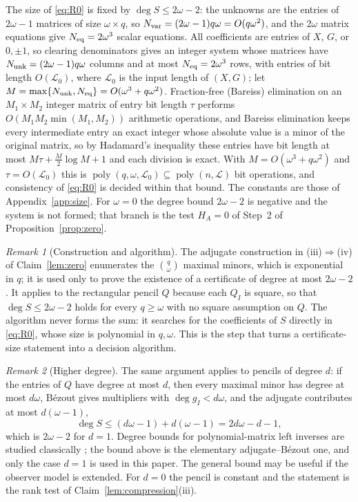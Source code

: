 \documentclass[journal]{IEEEtran}
\theoremstyle{plainn}
\theoremstyle{remark}
\newtheorem{remark}{Remark}
\begin{document}
The size of \eqref{eq:R0} is fixed by $\deg S\le2\omega-2$: the unknowns are the entries of
$2\omega-1$ matrices of size $\omega\times q$, so $N_{\rm var}=(2\omega-1)q\omega=O(q\omega^2)$,
and the $2\omega$ matrix equations give $N_{\rm eq}=2\omega^3$ scalar equations. All coefficients are entries of $X$, $G$, or
$0,\pm1$, so clearing denominators gives an integer system whose matrices have
$N_{\rm unk}=(2\omega-1)q\omega$ columns and at most $N_{\rm eq}=2\omega^3$ rows, with entries of bit
length $O(\mathcal L_0)$, where $\mathcal L_0$ is the input length of $(X,G)$; let
$M=\max\{N_{\rm unk},N_{\rm eq}\}=O(\omega^3+q\omega^2)$. Fraction-free (Bareiss) elimination on an
$M_1\times M_2$ integer matrix of entry bit length $\tau$ performs $O(M_1M_2\min(M_1,M_2))$ arithmetic
operations, and Bareiss elimination keeps every intermediate entry an exact integer whose absolute
value is a minor of the original matrix, so by Hadamard's inequality these entries have bit length at
most $M\tau+\tfrac{M}{2}\log M+1$ and each division is exact. With $M=O(\omega^3+q\omega^2)$ and
$\tau=O(\mathcal L_0)$
this is $\operatorname{poly}(q,\omega,\mathcal L_0)\subseteq\operatorname{poly}(n,\mathcal L)$ bit
operations, and consistency of \eqref{eq:R0} is decided within that bound. The constants are those of
Appendix~\ref{app:size}. For $\omega=0$ the degree
bound $2\omega-2$ is negative and the system is not formed; that branch is the test $H_A=0$ of Step~2
of Proposition~\ref{prop:zero}.

\begin{remark}[Construction and algorithm]\label{rem:construction}
The adjugate construction in (iii)$\Rightarrow$(iv) of Claim~\ref{lem:zero}
enumerates the $\binom q\omega$ maximal minors, which is exponential in $q$; it
is used only to prove the existence of a certificate of degree at most
$2\omega-2$. It applies to the rectangular pencil $Q$ because each $Q_I$ is
square, so that $\deg S\le2\omega-2$ holds for every $q\ge\omega$ with no square
assumption on $Q$. The algorithm never forms the sum: it searches for the
coefficients of $S$ directly in \eqref{eq:R0}, whose size is polynomial in
$q,\omega$. This is the step that turns a certificate-size statement into a
decision algorithm.
\end{remark}

\begin{remark}[Higher degree]\label{rem:degree}
The same argument applies to pencils of degree $d$: if the entries of $Q$ have
degree at most $d$, then every maximal minor has degree at most $d\omega$,
B\'ezout gives multipliers with $\deg g_I<d\omega$, and the adjugate contributes
at most $d(\omega-1)$,
\begin{equation*}
\deg S\le(d\omega-1)+d(\omega-1)=2d\omega-d-1,
\end{equation*}
which is $2\omega-2$ for $d=1$. Degree bounds for polynomial-matrix left
inverses are studied classically \cite{fab90}; the bound above is the elementary
adjugate--B\'ezout one, and only the case $d=1$ is used in this paper. The
general bound may be useful if the observer model is extended. For $d=0$ the
pencil is constant and the statement is the rank test of
Claim~\ref{lem:compression}(iii).
\end{remark}
\end{document}
